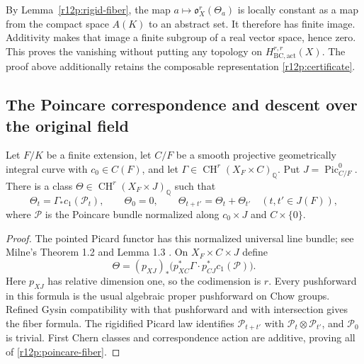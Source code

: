 \begin{remark}
By Lemma~\ref{r12p:rigid-fiber}, the map
$a\mapsto\mathfrak o_X^r(\Theta_a)$ is locally constant as a map
from the compact space $A(K)$ to an abstract set.  It therefore has
finite image.  Additivity makes that image a finite subgroup of a
real vector space, hence zero.  This proves the vanishing without
putting any topology on $H_{\mathrm{BC,act}}^{r,r}(X)$.
The proof above additionally retains the composable representation
\eqref{r12p:certificate}.
\end{remark}

\subsection{The Poincare correspondence and descent over the original field}

\begin{lemma}
\label{r12p:poincare}
Let $F/K$ be a finite extension, let $C/F$ be a smooth projective
geometrically integral curve with $c_0\in C(F)$, and let
$\Gamma\in\operatorname{CH}^r(X_F\times C)_{\mathbb Q}$.
Put $J=\operatorname{Pic}^0_{C/F}$.  There is a class
$\Theta\in\operatorname{CH}^r(X_F\times J)_{\mathbb Q}$ such that
\[
 \Theta_t=\Gamma_*c_1(\mathcal P_t),\qquad
 \Theta_0=0,\qquad \Theta_{t+t'}=\Theta_t+\Theta_{t'}
 \quad(t,t'\in J(F)),
\tag{R12.P8}\label{r12p:poincare-fiber}
\]
where $\mathcal P$ is the Poincare bundle normalized along
$c_0\times J$ and $C\times\{0\}$.
\end{lemma}

\begin{proof}
The pointed Picard functor has this normalized universal line bundle;
see Milne's Theorem 1.2 and Lemma 1.3 \cite{MilneJV}.  On
$X_F\times C\times J$ define
\[
 \Theta=(p_{XJ})_*\bigl(p_{XC}^*\Gamma\cdot
                              p_{CJ}^*c_1(\mathcal P)\bigr).
\tag{R12.P9}\label{r12p:poincare-family}
\]
Here $p_{XJ}$ has relative dimension one, so the codimension is $r$.
Every pushforward in this formula is the usual algebraic proper
pushforward on Chow groups.  Refined Gysin compatibility with that
pushforward and with intersection gives the fiber formula.
The rigidified Picard law identifies
$\mathcal P_{t+t'}$ with $\mathcal P_t\otimes\mathcal P_{t'}$,
and $\mathcal P_0$ is trivial.  First Chern classes and correspondence
action are additive, proving all of \eqref{r12p:poincare-fiber}.
\end{proof}

